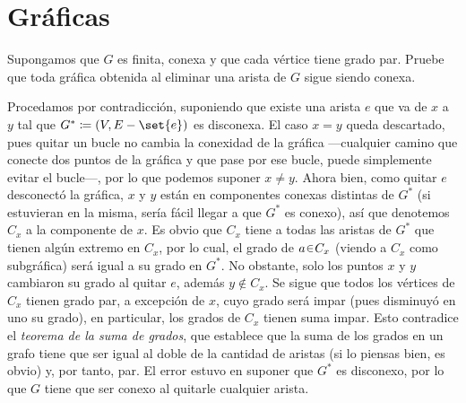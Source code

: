 
\section{Gráficas}

\begin{ejer}
Supongamos que $G$ es finita, conexa y que cada vértice tiene grado par. Pruebe que toda gráfica obtenida al eliminar una arista de $G$ sigue siendo conexa.
\end{ejer}
\begin{sol}[Demostración]
Procedamos por contradicción, suponiendo que existe una arista $e$ que va de $x$ a $y$ tal que $G^* \coloneq (V, E-\set{e})$ es disconexa. El caso $x=y$ queda descartado, pues quitar un bucle no cambia la conexidad de la gráfica ---cualquier camino que conecte dos puntos de la gráfica y que pase por ese bucle, puede simplemente evitar el bucle---, por lo que podemos suponer $x \neq y$. Ahora bien, como quitar $e$ desconectó la gráfica, $x$ y $y$ están en componentes conexas distintas de $G^*$ (si estuvieran en la misma, sería fácil llegar a que $G^*$ es conexo), así que denotemos $C_x$ a la componente de $x$. Es obvio que $C_x$ tiene a todas las aristas de $G^*$ que tienen algún extremo en $C_x$, por lo cual, el grado de $a \en C_x$ (viendo a $C_x$ como subgráfica) será igual a su grado en $G^*$. No obstante, solo los puntos $x$ y $y$ cambiaron su grado al quitar $e$, además $y \notin C_x$. Se sigue que todos los vértices de $C_x$ tienen grado par, a excepción de $x$, cuyo grado será impar (pues disminuyó en uno su grado), en particular, los grados de $C_x$ tienen suma impar. Esto contradice el \emph{teorema de la suma de grados}, que establece que la suma de los grados en un grafo tiene que ser igual al doble de la cantidad de aristas (si lo piensas bien, es obvio) y, por tanto, par. El error estuvo en suponer que $G^*$ es disconexo, por lo que $G$ tiene que ser conexo al quitarle cualquier arista.
\end{sol}

